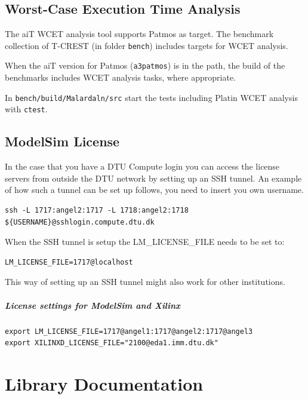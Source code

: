 \documentclass[a4paper,fontsize=10pt,twoside,DIV15,BCOR12mm,headinclude=true,footinclude=false,pagesize,bibtotoc]{scrbook}
\newcommand{\code}[1]{{\texttt{#1}}}
\begin{document}
\section{Worst-Case Execution Time Analysis}

The aiT WCET analysis tool supports Patmos as target. The benchmark collection
of T-CREST (in folder \code{bench}) includes targets for WCET analysis.

When the aiT version for Patmos (\code{a3patmos}) is in the path, the build of
the benchmarks includes WCET analysis tasks, where appropriate.

In \code{bench/build/Malardaln/src} start the tests including Platin WCET analysis with \code{ctest}.


\section{ModelSim License}
In the case that you have a DTU Compute login you can access the license servers from outside the DTU network by setting up an SSH tunnel.
An example of how such a tunnel can be set up follows, you need to insert you own username.

\begin{verbatim}
ssh -L 1717:angel2:1717 -L 1718:angel2:1718 ${USERNAME}@sshlogin.compute.dtu.dk
\end{verbatim}

When the SSH tunnel is setup the LM\_LICENSE\_FILE needs to be set to:
\begin{verbatim}
LM_LICENSE_FILE=1717@localhost
\end{verbatim}

This way of setting up an SSH tunnel might also work for other institutions.

\paragraph{License settings for ModelSim and Xilinx}

\begin{verbatim}
export LM_LICENSE_FILE=1717@angel1:1717@angel2:1717@angel3
export XILINXD_LICENSE_FILE="2100@eda1.imm.dtu.dk"
\end{verbatim}

\chapter{Library Documentation}
\label{apx:api}
\end{document}
